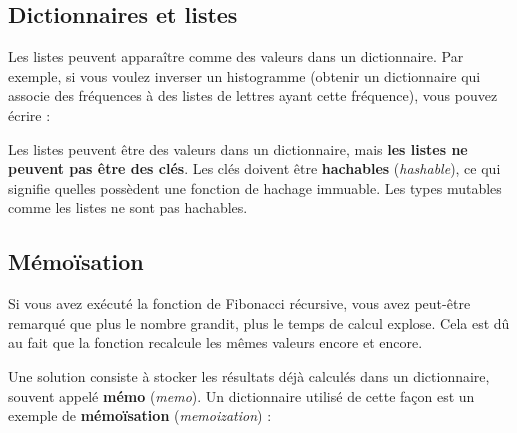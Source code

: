 \hypertarget{dictionnaires-et-listes}{%
\subsection{Dictionnaires et listes}\label{dictionnaires-et-listes}}

Les listes peuvent apparaître comme des valeurs dans un dictionnaire.
Par exemple, si vous voulez inverser un histogramme (obtenir un
dictionnaire qui associe des fréquences à des listes de lettres ayant
cette fréquence), vous pouvez écrire :

\begin{Shaded}
\begin{Highlighting}[]
\OperatorTok{=} \NormalTok{()}
\OperatorTok{=}
         
\OperatorTok{=}\NormalTok{ [k]}
        \NormalTok{:}
\end{Highlighting}
\end{Shaded}

Les listes peuvent être des valeurs dans un dictionnaire, mais
\textbf{les listes ne peuvent pas être des clés}. Les clés doivent être
\textbf{hachables} (\emph{hashable}), ce qui signifie
qu\textquotesingle elles possèdent une fonction de hachage immuable. Les
types mutables comme les listes ne sont pas hachables.

\hypertarget{muxe9mouxefsation}{%
\subsection{Mémoïsation}\label{muxe9mouxefsation}}

Si vous avez exécuté la fonction de Fibonacci récursive, vous avez
peut-être remarqué que plus le nombre grandit, plus le temps de calcul
explose. Cela est dû au fait que la fonction recalcule les mêmes valeurs
encore et encore.

Une solution consiste à stocker les résultats déjà calculés dans un
dictionnaire, souvent appelé \textbf{mémo} (\emph{memo}). Un
dictionnaire utilisé de cette façon est un exemple de
\textbf{mémoïsation} (\emph{memoization}) :


